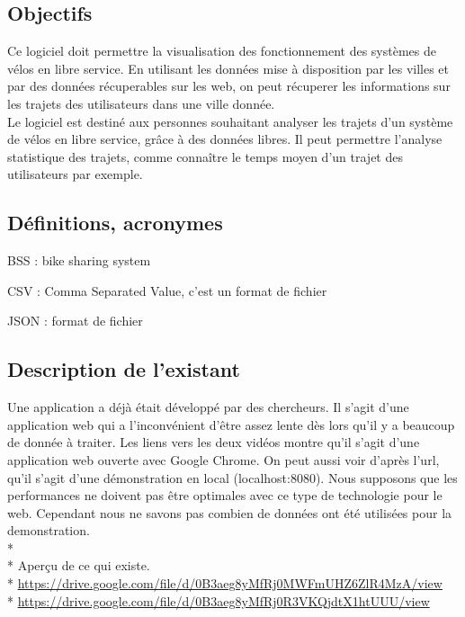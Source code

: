 \documentclass[12pt]{article}
\begin{document}
		\subsection{Objectifs}
			Ce logiciel doit permettre la visualisation des fonctionnement des systèmes de vélos en libre service. En utilisant les données mise à disposition par les villes et par des données récuperables sur les web, on peut récuperer les informations sur les trajets des utilisateurs dans une ville donnée.\\
			Le logiciel est destiné aux personnes souhaitant analyser les trajets d'un système de vélos en libre service, grâce à des données libres. Il peut permettre l'analyse statistique des trajets, comme connaître le temps moyen d'un trajet des utilisateurs par exemple.

		\subsection{Définitions, acronymes}
			BSS : bike sharing system\par
			CSV : Comma Separated Value, c'est un format de fichier\par
			JSON : format de fichier

		\subsection{Description de l'existant}
			Une application a déjà était développé par des chercheurs. Il s’agit d’une application web qui a l’inconvénient d’être assez lente dès lors qu’il y a beaucoup de donnée à traiter. Les liens vers les deux vidéos montre qu'il s'agit d'une application web ouverte avec Google Chrome. On peut aussi voir d'après l'url, qu'il s'agit d'une démonstration en local (localhost:8080). Nous supposons que les performances ne doivent pas être optimales avec ce type de technologie pour le web. Cependant nous ne savons pas combien de données ont été utilisées pour la demonstration.\\*\\*
			Aperçu de ce qui existe.\\*
			\url{https://drive.google.com/file/d/0B3aeg8yMfRj0MWFmUHZ6ZlR4MzA/view}\\*
			\url{https://drive.google.com/file/d/0B3aeg8yMfRj0R3VKQjdtX1htUUU/view}
		
\end{document}
